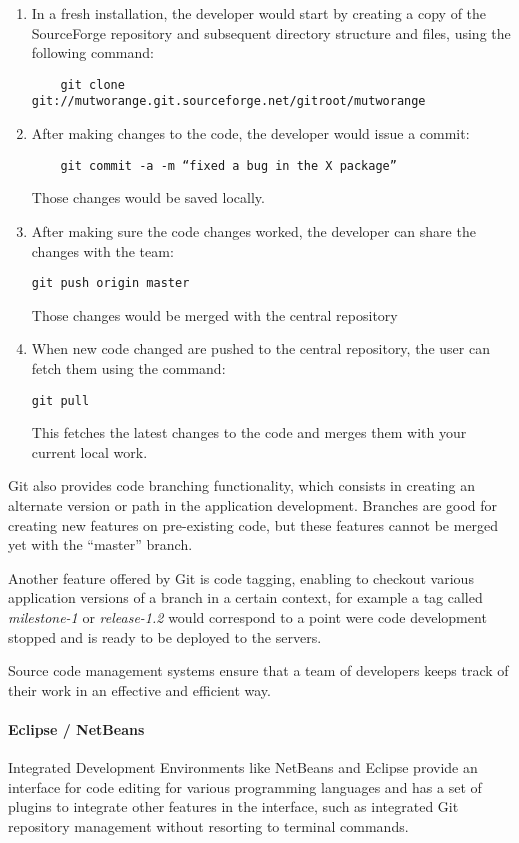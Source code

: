 \begin{enumerate}
  \item In a fresh installation, the developer would start by creating a copy of
  the SourceForge repository and subsequent directory structure and files, using the following command:
  \begin{verbatim}
  	git clone git://mutworange.git.sourceforge.net/gitroot/mutworange
  \end{verbatim}
  \item After making changes to the code, the developer would issue a commit:
  \begin{verbatim}
  	git commit -a -m “fixed a bug in the X package”
  \end{verbatim}
  Those changes would be saved locally.
  \item After making sure the code changes worked, the developer can share the
  changes with the team:
\begin{verbatim}
git push origin master
\end{verbatim}
Those changes would be merged with the central repository
  \item When new code changed are pushed to the central repository, the user can
  fetch them using the command:
\begin{verbatim}
git pull
\end{verbatim}
This fetches the latest changes to the code and merges them with your current
local work.
\end{enumerate}

Git also provides code branching functionality, which consists in creating an
alternate version or path in the application development. Branches are good for
creating new features on pre-existing code, but these features cannot be merged
yet with the “master” branch.

Another feature offered by Git is code tagging, enabling to checkout various
application versions of a branch in a certain context, for example a tag called
\emph{milestone-1} or \emph{release-1.2} would correspond to a point were code
development stopped and is ready to be deployed to the servers.

Source code management systems ensure that a team of developers keeps track of
their work in an effective and efficient way.

\paragraph{Eclipse / NetBeans}
Integrated Development Environments like NetBeans and Eclipse provide an
interface for code editing for various programming languages and has a set of
plugins to integrate other features in the interface, such as integrated Git
repository management without resorting to terminal commands.

